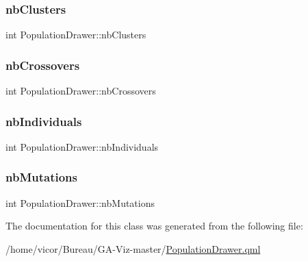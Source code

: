 \subsubsection{\texorpdfstring{nb\+Clusters}{nbClusters}}
{\footnotesize\ttfamily int Population\+Drawer\+::nb\+Clusters}

\mbox{\label{class_population_drawer_acb640608b088ecc9fe64fb31bc00f91e}} 
\subsubsection{\texorpdfstring{nb\+Crossovers}{nbCrossovers}}
{\footnotesize\ttfamily int Population\+Drawer\+::nb\+Crossovers}

\mbox{\label{class_population_drawer_af20bdfe73e9bda7aba2257a101771071}} 
\subsubsection{\texorpdfstring{nb\+Individuals}{nbIndividuals}}
{\footnotesize\ttfamily int Population\+Drawer\+::nb\+Individuals}

\mbox{\label{class_population_drawer_ae31d2743689e0cca64420d05fa120bda}} 
\subsubsection{\texorpdfstring{nb\+Mutations}{nbMutations}}
{\footnotesize\ttfamily int Population\+Drawer\+::nb\+Mutations}



The documentation for this class was generated from the following file\+:\begin{DoxyCompactItemize}
\item 
/home/vicor/\+Bureau/\+G\+A-\/\+Viz-\/master/\hyperlink{_population_drawer_8qml}{Population\+Drawer.\+qml}\end{DoxyCompactItemize}

